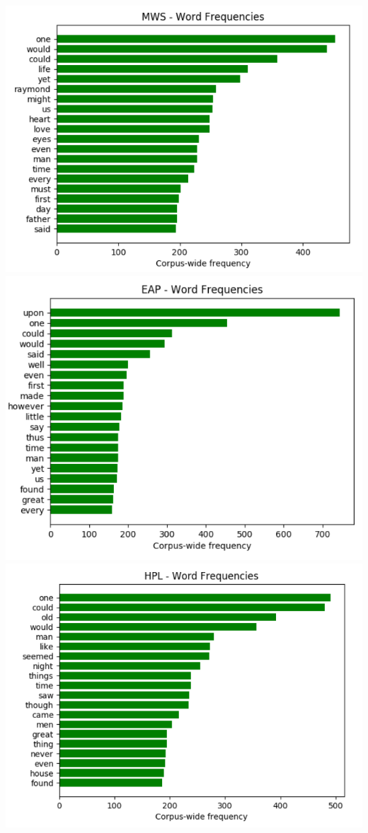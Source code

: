 \documentclass[12pt]{article}
\begin{document}
\includegraphics[scale=.45, center]{images/word_freq_mws.png}
\vskip 0.2in
\includegraphics[scale=.45, center]{images/word_freq_eap.png}
\vskip 0.2in
\includegraphics[scale=.45, center]{images/word_freq_hpl.png}
\vskip 0.2in
\end{document}
